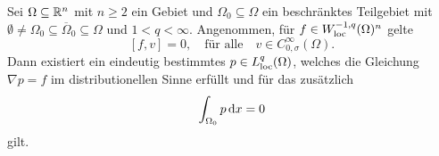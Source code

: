 \begin{lem}
  \label{lem:gradientCriterion}
  Sei $\Omega \subseteq \mathbb{R}^n$ mit $n \geq 2$ ein Gebiet und $\Omega_0 \subseteq \Omega$ ein beschränktes Teilgebiet mit $\emptyset \neq \Omega_0 \subseteq \overline\Omega_0 \subseteq \Omega$ und $1 < q < \infty$.
  Angenommen, für $f \in W_{\operatorname{loc}}^{-1,q}(\Omega)^n$ gelte
  \begin{equation}
    \label{eq:vKernel}
    [f,v] = 0, \quad \text{für alle} \quad v \in C_{0,\sigma}^\infty(\Omega).
  \end{equation}
  Dann existiert ein eindeutig bestimmtes $p \in L^q_{\operatorname{loc}}(\Omega)$, welches die Gleichung $\nabla p = f$ im distributionellen Sinne erfüllt und für das zusätzlich
  \begin{equation}
    \label{eq:0integral}
    \int_{\Omega_0} p \, {\operatorname{d}\!{x}} = 0
  \end{equation}
  gilt.
\end{lem}

